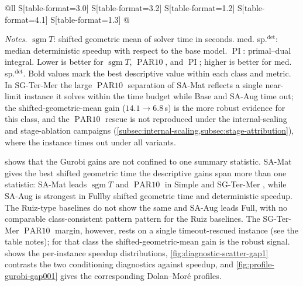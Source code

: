 \documentclass[AMA,Times1COL]{WileyNJDv5} %
\newcommand{\methodBase}{Base}
\newcommand{\methodAug}{SA-Aug}
\newcommand{\methodMat}{SA-Mat}
\newcommand{\sgm}{\ensuremath{\operatorname{sgm}}}
\newcommand{\PARten}{\ensuremath{\operatorname{PAR10}}}
\newcommand{\PI}{\ensuremath{\operatorname{PI}}}
\providecommand{\DIFadd}[1]{{\protect\color{blue} \sf #1}} %
\providecommand{\DIFdel}[1]{{\protect\color{red} \scriptsize #1}} %
\providecommand{\DIFaddbegin}{} %
\providecommand{\DIFaddend}{} %
\providecommand{\DIFdelbegin}{} %
\providecommand{\DIFdelend}{} %
\begin{document}
\begin{table}[t]
\begin{tabular}{@{}ll S[table-format=3.0] S[table-format=3.2] S[table-format=1.2] S[table-format=4.1] S[table-format=1.3] @{}}
\bottomrule
\end{tabular}
\begin{flushleft}\footnotesize
\emph{Notes.} $\sgm T$: shifted geometric mean of solver time in seconds. med.
sp.$^{\det}$: median deterministic speedup with respect to the base model. \PI{}:
primal--dual integral. Lower is better for $\sgm T$, \PARten{}, and \PI{};
higher is better for med. sp.$^{\det}$. Bold values mark the best descriptive value within
each class and metric. In SG-Ter-Mer the large \PARten{} separation of \methodMat{}
reflects a single near-limit instance it solves within the time budget while \methodBase{}
and \methodAug{} time out; the shifted-geometric-mean gain ($14.1\!\to\!6.8$\,s) is the more
robust evidence for this class, and the \PARten{} rescue is not reproduced under the
internal-scaling and stage-ablation campaigns (\cref{subsec:internal-scaling,subsec:stage-attribution}),
where the instance times out under all variants.
\end{flushleft}
\end{table}
\DIFaddend 

\noindent {} shows \DIFdelbegin \DIFdel{that the Gurobi gains are not confined to one summary statistic. \methodMat{} gives the best shifted geometric time }\DIFdelend \DIFaddbegin \DIFadd{the descriptive gains span more than one statistic: \methodMat{} leads $\sgm T$ }\DIFaddend and \PARten{} in Simple and SG-Ter-Mer \DIFdelbegin \DIFdel{, while \methodAug{} is strongest in Fullby shifted geometric time and deterministic speedup. The Ruiz-type baselines do not show the same }\DIFdelend \DIFaddbegin \DIFadd{and \methodAug{} leads Full, with no comparable }\DIFaddend class-consistent \DIFdelbegin \DIFdel{pattern}\DIFdelend \DIFaddbegin \DIFadd{pattern for the Ruiz baselines. The SG-Ter-Mer }\PARten{} \DIFadd{margin, however, rests on a single timeout-rescued instance (see the table notes); for that class the shifted-geometric-mean gain is the robust signal. \Cref{fig:boxplot-speedup-total-gap1} shows the per-instance speedup distributions, \cref{fig:diagnostic-scatter-gap1} contrasts the two conditioning diagnostics against speedup, and \cref{fig:profile-gurobi-gap001} gives the corresponding Dolan--Mor\'e profiles}\DIFaddend .
\end{document}
